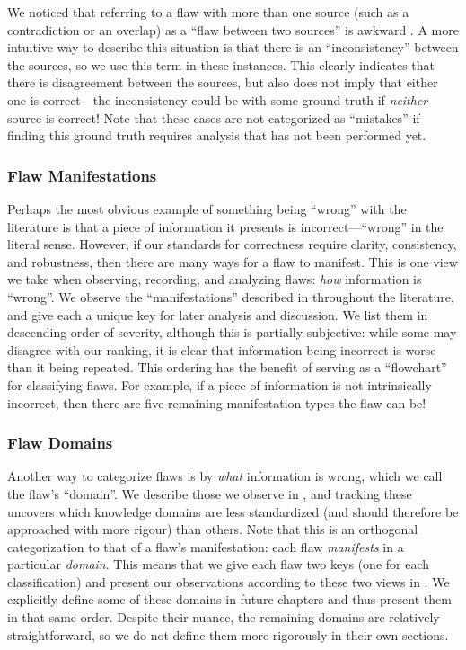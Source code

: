 We noticed that referring to a flaw with more than one source (such as a
contradiction or an overlap) as a ``flaw between two sources'' is awkward%
. A more intuitive way to describe this situation
is that there is an ``inconsistency'' between the sources, so we use this term
in these instances. This clearly indicates that there is disagreement between
the sources, but also does not imply that either one is correct---the
inconsistency could be with some ground truth
if \emph{neither} source is correct! Note that these
cases are not categorized as ``mistakes'' if finding this ground truth requires
analysis that has not been performed yet.

\subsubsection{Flaw Manifestations}\label{mnfst-def}

Perhaps the most obvious example of something being ``wrong'' with the
literature is that a piece of information it presents is incorrect---``wrong''
in the literal sense. However, if our standards for correctness require
clarity, consistency, and robustness, then there are many ways for a flaw to
manifest. This is one view we take when observing, recording, and analyzing
flaws: \emph{how} information is ``wrong''. We observe the
``manifestations'' described in  throughout the
literature, and give each a unique key for later analysis and discussion. We
list them in descending order of severity, although this is partially
subjective: while some may disagree with our ranking, it is clear that
information being incorrect is worse than it being repeated. This ordering has
the benefit of serving as a ``flowchart'' for classifying flaws. For example,
if a piece of information is not intrinsically incorrect, then there are five
remaining manifestation types the flaw can be!



\ifnotpaper \newpage \fi

\subsubsection{Flaw Domains}\label{dmn-def}

Another way to categorize flaws is by \emph{what} information is wrong, which
we call the flaw's ``domain''. We describe those we observe in
, and tracking these uncovers which knowledge domains
are less standardized (and should therefore be approached with more rigour)
than others. Note that this is an orthogonal categorization to that of a flaw's
manifestation: each flaw \emph{manifests} in a particular \emph{domain}. This
means that we give each flaw two keys (one for each classification) and
present our observations according to these two views in . We explicitly define some of these domains in future
chapters and thus present them in that same order. Despite their nuance, the
remaining domains are relatively straightforward, so we do not define them more
rigorously in their own sections.


